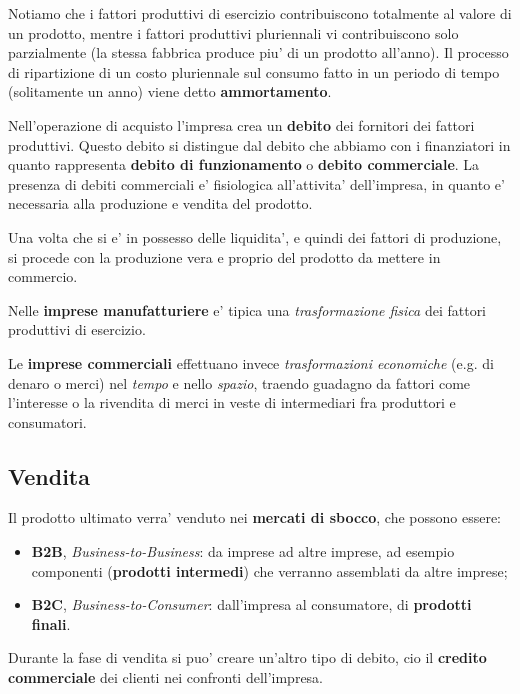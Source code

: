 \documentclass[a4paper,11pt]{article}
\begin{document}
Notiamo che i fattori produttivi di esercizio contribuiscono totalmente al valore di un prodotto, mentre i fattori produttivi pluriennali vi contribuiscono solo parzialmente (la stessa fabbrica produce piu' di un prodotto all'anno).
Il processo di ripartizione di un costo pluriennale sul consumo fatto in un periodo di tempo (solitamente un anno) viene detto \textbf{ammortamento}.

Nell'operazione di acquisto l'impresa crea un \textbf{debito} dei fornitori dei fattori produttivi.
Questo debito si distingue dal debito che abbiamo con i finanziatori in quanto rappresenta \textbf{debito di funzionamento} o \textbf{debito commerciale}.
La presenza di debiti commerciali e' fisiologica all'attivita' dell'impresa, in quanto e' necessaria alla produzione e vendita del prodotto.

\par\smallskip

Una volta che si e' in possesso delle liquidita', e quindi dei fattori di produzione, si procede con la produzione vera e proprio del prodotto da mettere in commercio.

Nelle \textbf{imprese manufatturiere} e' tipica una \textit{trasformazione fisica} dei fattori produttivi di esercizio.

Le \textbf{imprese commerciali} effettuano invece \textit{trasformazioni economiche} (e.g. di denaro o merci) nel \textit{tempo} e nello \textit{spazio}, traendo guadagno da fattori come l'interesse o la rivendita di merci in veste di intermediari fra produttori e consumatori.

\subsection{Vendita}
Il prodotto ultimato verra' venduto nei \textbf{mercati di sbocco}, che possono essere:
\begin{itemize}
	\item \textbf{B2B}, \textit{Business-to-Business}: da imprese ad altre imprese, ad esempio componenti (\textbf{prodotti intermedi}) che verranno assemblati da altre imprese;
	\item \textbf{B2C}, \textit{Business-to-Consumer}: dall'impresa al consumatore, di \textbf{prodotti finali}.
\end{itemize}

Durante la fase di vendita si puo' creare un'altro tipo di debito, cio il \textbf{credito commerciale} dei clienti nei confronti dell'impresa.
\end{document}
